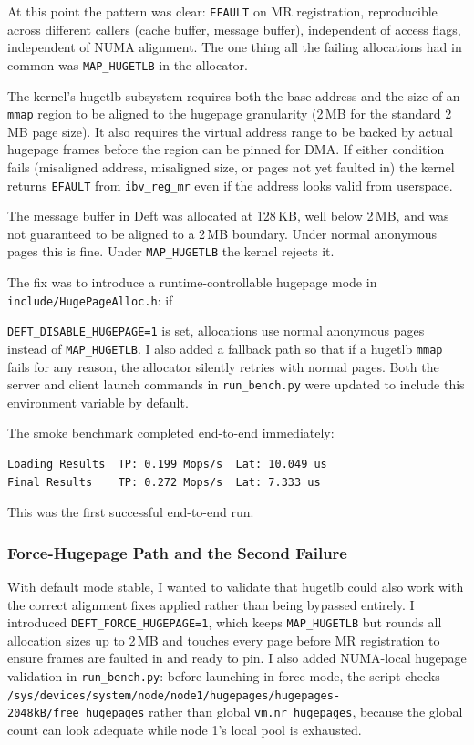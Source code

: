 \documentclass[10pt]{article}
\begin{document}
At this point the pattern was clear: \texttt{EFAULT} on MR registration,
reproducible across different callers (cache buffer, message buffer), independent
of access flags, independent of NUMA alignment.
The one thing all the failing allocations had in common was \texttt{MAP\_HUGETLB}
in the allocator.

The kernel's hugetlb subsystem requires both the base address and the size of an
\texttt{mmap} region to be aligned to the hugepage granularity (2\,MB for the
standard 2\,MB page size).
It also requires the virtual address range to be backed by actual hugepage frames
before the region can be pinned for DMA.
If either condition fails (misaligned address, misaligned size, or pages not yet
faulted in) the kernel returns \texttt{EFAULT} from \texttt{ibv\_reg\_mr} even if
the address looks valid from userspace.

The message buffer in Deft was allocated at 128\,KB, well below 2\,MB, and was
not guaranteed to be aligned to a 2\,MB boundary.
Under normal anonymous pages this is fine.
Under \texttt{MAP\_HUGETLB} the kernel rejects it.

The fix was to introduce a runtime-controllable hugepage mode in
\texttt{include/HugePageAlloc.h}: if

\texttt{DEFT\_DISABLE\_HUGEPAGE=1} is set,
allocations use normal anonymous pages instead of \texttt{MAP\_HUGETLB}.
I also added a fallback path so that if a hugetlb \texttt{mmap} fails for any reason,
the allocator silently retries with normal pages.
Both the server and client launch commands in \texttt{run\_bench.py} were updated
to include this environment variable by default.

The smoke benchmark completed end-to-end immediately:
\begin{lstlisting}
Loading Results  TP: 0.199 Mops/s  Lat: 10.049 us
Final Results    TP: 0.272 Mops/s  Lat: 7.333 us
\end{lstlisting}
This was the first successful end-to-end run.

\subsubsection{Force-Hugepage Path and the Second Failure}

With default mode stable, I wanted to validate that hugetlb could also work with
the correct alignment fixes applied rather than being bypassed entirely.
I introduced \texttt{DEFT\_FORCE\_HUGEPAGE=1}, which keeps \texttt{MAP\_HUGETLB}
but rounds all allocation sizes up to 2\,MB and touches every page before MR
registration to ensure frames are faulted in and ready to pin.
I also added NUMA-local hugepage validation in \texttt{run\_bench.py}: before
launching in force mode, the script checks
\texttt{/sys/devices/system/node/node1/hugepages/hugepages-2048kB/free\_hugepages}
rather than global \texttt{vm.nr\_hugepages}, because the global count can look
adequate while node 1's local pool is exhausted.
\end{document}
